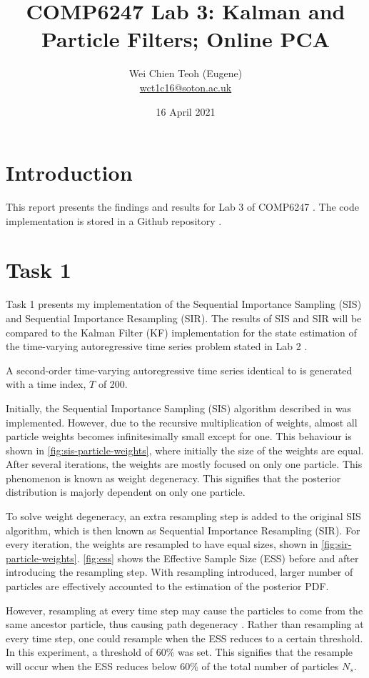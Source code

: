 \documentclass{article}
\title{COMP6247 Lab 3: Kalman and Particle Filters; Online PCA}
\author{Wei Chien Teoh (Eugene)\\\bigskip \href{mailto:wct1c16@soton.ac.uk}{wct1c16@soton.ac.uk}}
\date{16 April 2021}
\begin{document}
\maketitle

\section{Introduction}

This report presents the findings and results for Lab 3 of COMP6247 \cite{lab3}. The code implementation is stored in a Github repository \cite{github}.

\section{Task 1} \label{sec:task-1}

Task 1 presents my implementation of the Sequential Importance Sampling (SIS) and Sequential Importance Resampling (SIR). The results of SIS and SIR will be compared to the Kalman Filter (KF) implementation \cite{lab2ans} for the state estimation of the time-varying autoregressive time series problem stated in Lab 2 \cite{lab2}.

A second-order time-varying autoregressive time series identical to \cite{lab2} is generated with a time index, $T$ of 200.

Initially, the Sequential Importance Sampling (SIS) algorithm described in \cite{particle_filters} was implemented. However, due to the recursive multiplication of weights, almost all particle weights becomes infinitesimally small except for one. This behaviour is shown in \cref{fig:sis-particle-weights}, where initially the size of the weights are equal. After several iterations, the weights are mostly focused on only one particle. This phenomenon is known as weight degeneracy. This signifies that the posterior distribution is majorly dependent on only one particle.

To solve weight degeneracy, an extra resampling step \cite{particle_filters} is added to the original SIS algorithm, which is then known as Sequential Importance Resampling (SIR). For every iteration, the weights are resampled to have equal sizes, shown in \cref{fig:sir-particle-weights}. \cref{fig:ess} shows the Effective Sample Size (ESS) before and after introducing the resampling step. With resampling introduced, larger number of particles are effectively accounted to the estimation of the posterior PDF.

However, resampling at every time step may cause the particles to come from the same ancestor particle, thus causing path degeneracy \cite{lecture6}. Rather than resampling at every time step, one could resample when the ESS reduces to a certain threshold. In this experiment, a threshold of 60\% was set. This signifies that the resample will occur when the ESS reduces below 60\% of the total number of particles $N_s$.
\end{document}
